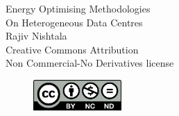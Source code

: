 \thispagestyle{empty}
    \begin{centering}
    {\LARGE Energy Optimising Methodologies \\
        \vspace{0.5em}
        On Heterogeneous Data Centres} \\
    \vspace*{3in}%
         Rajiv Nishtala\\
        Creative Commons Attribution  \\ Non Commercial-No Derivatives license \\
    \end{centering}
        
\begin{figure}[b]
    \centering
    \includegraphics[width=0.3\textwidth]{by-nc-nd.png}
\end{figure}


